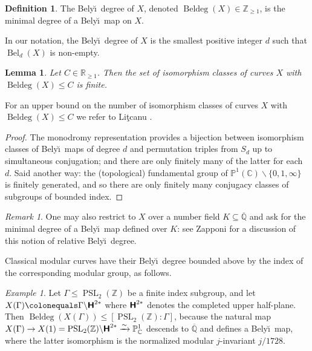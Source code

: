 \documentclass{amsproc}
\numberwithin{equation}{section}
\numberwithin{figure}{section}
\newtheorem{lemma}[equation]{Lemma}
\theoremstyle{definition}
\newtheorem{definition}[equation]{Definition}
\theoremstyle{remark}
\newtheorem{remark}[equation]{Remark}
\newtheorem{example}[equation]{Example}
\DeclareMathOperator{\Beldeg}{Beldeg}
\newcommand{\Bdeg}{\Beldeg}
\DeclareMathOperator{\PSL}{PSL}
\newcommand{\Qbar}{\overline{\mathbb{Q}}}
\newcommand{\QQbar}{\Qbar}
\newcommand\PP{\mathbb{P}}
\newcommand\ZZ{\mathbb{Z}}
\newcommand\RR{\mathbb{R}}
\newcommand\CC{\mathbb{C}}
\newcommand\Z{\mathbb{Z}}
\newcommand{\Htwost}{\textup{\textbf{\textsf{H}}}^{2*}}
\newcommand{\p}{\mathbb{P}}
\DeclareMathOperator{\Bel}{Bel}
\renewcommand{\leq}{\leqslant}
\renewcommand{\geq}{\geqslant}
\newcommand{\Belyi}{Bely\u{\i}}
\newcommand{\defi}[1]{\textsf{#1}} 	%
\newcommand{\aj}[1]{{\color{magenta} \textsf{[[#1]]}}}
\begin{document}
\begin{definition}\label{def:belyi_deg}
The \defi{\Belyi\ degree} of $X$, denoted $\Beldeg(X) \in \Z_{\geq 1}$, is the minimal degree of a \Belyi\ map on $X$.
\end{definition}

In our notation, the \Belyi\ degree of $X$ is the smallest positive integer $d$ such that $\Bel_d(X)$ is non-empty.

\begin{lemma} \label{lem:fin}
Let $C\in \RR_{\geq 1}$. Then
  the set of isomorphism classes of curves $X$ with $\Beldeg(X)\leq C$ is finite.
\end{lemma}

For an upper bound on the number of isomorphism classes of curves $X$ with $\Beldeg(X)\leq C$ we refer to Li\c{t}canu \cite[Th\'eor\`eme 2.1]{Litcanu}. %

\begin{proof}
The monodromy representation provides a bijection between isomorphism classes of \Belyi\ maps of degree $d$ and permutation triples from $S_d$ up to simultaneous conjugation; and there are only finitely many of the latter for each $d$.  Said another way: the (topological) fundamental group of $\p^1(\CC) \smallsetminus \{0,1,\infty\}$ is finitely generated, and so there are only finitely many conjugacy classes of subgroups of bounded index.
\end{proof}

\begin{remark}
One may also restrict to $X$ over a number field $K \subseteq \Qbar$ and ask for the minimal degree of a \Belyi\ map defined over $K$: see Zapponi \cite{Zapponi} for a discussion of this notion of relative \Belyi\ degree.
\end{remark}

Classical modular curves have their \Belyi\ degree bounded above by the index of the corresponding modular group, as follows.

\begin{example}
Let $\Gamma \leq \PSL_2(\ZZ)$ be a finite index subgroup, and let $X(\Gamma) \colonequals \Gamma \backslash \Htwost$ where $\Htwost$ denotes the completed upper half-plane.  Then $\Bdeg(X(\Gamma)) \leq [\PSL_2(\ZZ):\Gamma]$, because the natural map $X(\Gamma) \to X(1) = \PSL_2(\ZZ) \backslash \Htwost \xrightarrow{\sim} \PP^1_{\CC}$ descends to $\QQbar$ and defines a \Belyi\ map, where the latter isomorphism is the normalized modular $j$-invariant $j/1728$.
\end{example}
\end{document}
